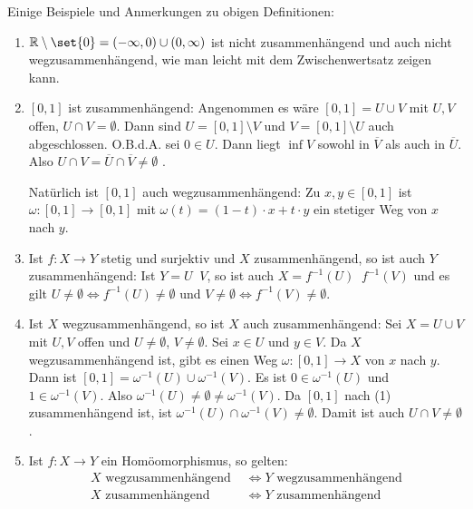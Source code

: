 \begin{bemerkung}[{name=[einfache Aussagen zu (weg)zusammenhängenden Räumen]}]
	Einige Beispiele und Anmerkungen zu obigen Definitionen:
	\begin{enumerate}[(1)]
		\item $\mathbb{R} \setminus \set{0} = {(-\infty,0)} \cup {(0, \infty)}$ ist nicht zusammenhängend und auch nicht wegzusammenhängend, wie man leicht mit dem Zwischenwertsatz zeigen kann.
		\item $[0,1]$ ist zusammenhängend: Angenommen es wäre $[0,1] = U \cup V$ mit $U, V$ offen, $U \cap V = \emptyset$. 
		Dann sind $U= [0,1] \setminus V$ und $V= [0,1] \setminus U$ auch abgeschlossen. 
		O.B.d.A. sei $0 \in U$. 
		Dann liegt $\inf V$ sowohl in $\overline{V}$ als auch in $\overline{U}$. 
		Also $U \cap V = \overline{U} \cap \overline{V} \neq \emptyset$ \light.
	
		Natürlich ist $[0,1]$ auch wegzusammenhängend: Zu $x,y\in [0,1]$ ist $\omega \colon [0,1]\to [0,1]$ mit $\omega(t)=(1-t)\cdot x +t\cdot y$ ein stetiger Weg von $x$ nach $y$.
		\item Ist $f \colon X \to Y$ stetig und surjektiv und $X$ zusammenhängend, so ist auch $Y$ zusammenhängend: 
		Ist $Y = U \mathop{\dot{\cup}} V$, so ist auch $X = f ^{-1}(U) \mathop{\dot{\cup}} f^{-1}(V)$ und es gilt $U \neq \emptyset \iff f^{-1}(U) \neq \emptyset$ und $V \neq \emptyset \iff f^{-1}(V) \neq \emptyset$.
		\item Ist $X$ wegzusammenhängend, so ist $X$ auch zusammenhängend: 
		Sei $X= U \cup V$ mit $U,V$ offen und $U \not= \emptyset$, $V \not= \emptyset$. 
		Sei $x \in U$ und $y \in V$.
		Da $X$ wegzusammenhängend ist, gibt es einen Weg $\omega \colon [0,1] \to X$ von $x$ nach $y$. 
		Dann ist $[0,1] = \omega ^{-1}(U) \cup \omega ^{-1}(V)$. 
		Es ist $0 \in \omega ^{-1} (U)$ und $1 \in \omega ^{-1}(V)$. 
		Also $\omega ^{-1} (U) \neq \emptyset \neq \omega ^{-1}(V)$. 
		Da $[0,1]$ nach (1) zusammenhängend ist, ist $\omega^{-1} (U) \cap \omega ^{-1}(V) \neq \emptyset$. 
		Damit ist auch $U \cap V \neq \emptyset$.
		\item Ist $f \colon X \to Y$ ein Homöomorphismus, so gelten:
		\begin{align*}
			X \text{ wegzusammenhängend } &\iff Y \text{ wegzusammenhängend} \\
			X \text{ zusammenhängend } &\iff Y \text{ zusammenhängend}
		\end{align*}
	\end{enumerate}
\end{bemerkung}

